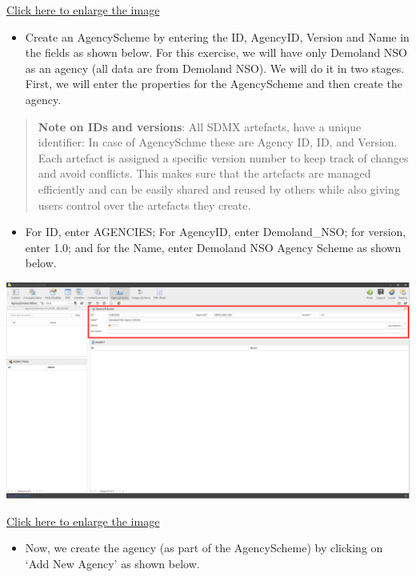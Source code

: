 \documentclass[
]{book}
\providecommand{\tightlist}{%
  \setlength{\itemsep}{0pt}\setlength{\parskip}{0pt}}
\theoremstyle{definition}
\theoremstyle{definition}
\theoremstyle{definition}
\theoremstyle{definition}
\theoremstyle{remark}
\begin{document}
\href{images/image060.png}{Click here to enlarge the image}

\begin{itemize}
\tightlist
\item
  Create an AgencyScheme by entering the ID, AgencyID, Version and Name in the fields as shown below. For this exercise, we will have only Demoland NSO as an agency (all data are from Demoland NSO). We will do it in two stages. First, we will enter the properties for the AgencyScheme and then create the agency.
\end{itemize}

\begin{quote}
\textbf{Note on IDs and versions}: All SDMX artefacts, have a unique identifier: In case of AgencySchme these are Agency ID, ID, and Version. Each artefact is assigned a specific version number to keep track of changes and avoid conflicts. This makes sure that the artefacts are managed efficiently and can be easily shared and reused by others while also giving users control over the artefacts they create.
\end{quote}

\begin{itemize}
\tightlist
\item
  For ID, enter AGENCIES; For AgencyID, enter Demoland\_NSO; for version, enter 1.0; and for the Name, enter Demoland NSO Agency Scheme as shown below.
\end{itemize}

\begin{center}\includegraphics[width=1\linewidth]{./images/image062} \end{center}

\href{images/image062.png}{Click here to enlarge the image}

\begin{itemize}
\tightlist
\item
  Now, we create the agency (as part of the AgencyScheme) by clicking on `Add New Agency' as shown below.
\end{itemize}
\end{document}
